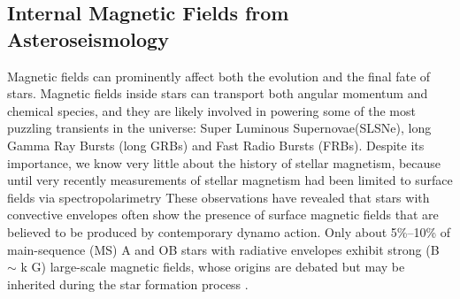 \subsection{Internal Magnetic Fields from Asteroseismology}

Magnetic fields can prominently affect both the evolution and the final fate of stars. Magnetic fields inside stars can transport both angular momentum and chemical species, and they are likely involved in powering some of the most puzzling transients in the universe: Super Luminous Supernovae(SLSNe), long Gamma Ray Bursts (long GRBs) and Fast Radio Bursts (FRBs). Despite its importance, we know very little about the history of stellar magnetism, because until very recently measurements of stellar magnetism had been limited to surface fields via spectropolarimetry
{\color{green} These observations have revealed that stars with convective envelopes often show the presence of surface magnetic fields that are believed to be produced by contemporary dynamo action. Only about 5\%–10\% of main-sequence (MS) A and OB stars with radiative envelopes exhibit strong (B $\sim$ k G) large-scale magnetic fields, whose origins are debated but may be inherited during the star formation process \citep[fossil fields, see e.g.,][]{2012ASPC..464..405W}.}
